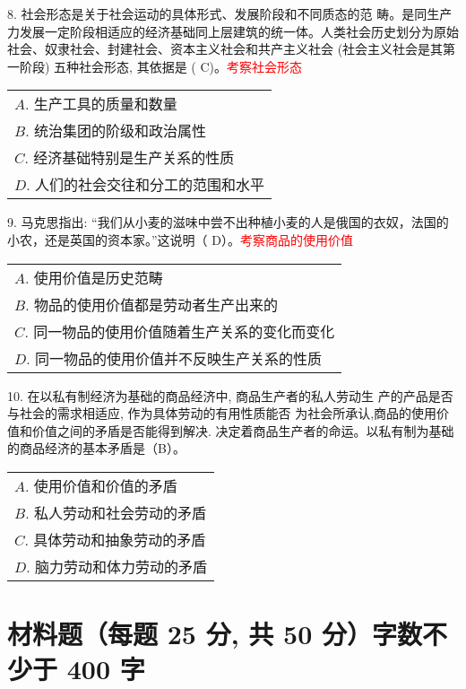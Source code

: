 \documentclass[a4paper,12pt]{article}
\begin{document}
8. 社会形态是关于社会运动的具体形式、发展阶段和不同质态的范  畴。是同生产力发展一定阶段相适应的经济基础同上层建筑的统一体。人类社会历史划分为原始社会、奴隶社会、封建社会、资本主义社会和共产主义社会 (社会主义社会是其第一阶段) 五种社会形态, 其依据是 ( C)。\textcolor{red}{考察社会形态}


\noindent\begin{tabular}{l}
$ A $.  生产工具的质量和数量\\
$ B $. 统治集团的阶级和政治属性\\
$ C $. 经济基础特别是生产关系的性质\\
$ D $. 人们的社会交往和分工的范围和水平\\
\end{tabular}




9. 马克思指出: “我们从小麦的滋味中尝不出种植小麦的人是俄国的衣奴，法国的小农，还是英国的资本家。”这说明（ D）。\textcolor{red}{考察商品的使用价值}

\noindent\begin{tabular}{l}
$ A $.  使用价值是历史范畴\\
$ B $. 物品的使用价值都是劳动者生产出来的\\
$ C $. 同一物品的使用价值随着生产关系的变化而变化\\
$ D $. 同一物品的使用价值并不反映生产关系的性质\\
\end{tabular}



10. 在以私有制经济为基础的商品经济中, 商品生产者的私人劳动生  产的产品是否与社会的需求相适应, 作为具体劳动的有用性质能否 为社会所承认,商品的使用价值和价值之间的矛盾是否能得到解决.  决定着商品生产者的命运。以私有制为基础的商品经济的基本矛盾是（B）。

\noindent\begin{tabular}{l}
$ A $.  使用价值和价值的矛盾\\
$ B $. 私人劳动和社会劳动的矛盾\\
$ C $. 具体劳动和抽象劳动的矛盾\\
$ D $. 脑力劳动和体力劳动的矛盾\\
\end{tabular}

\newpage
\section{材料题（每题  25 分, 共 50 分）字数不少于 400 字}
\end{document}
